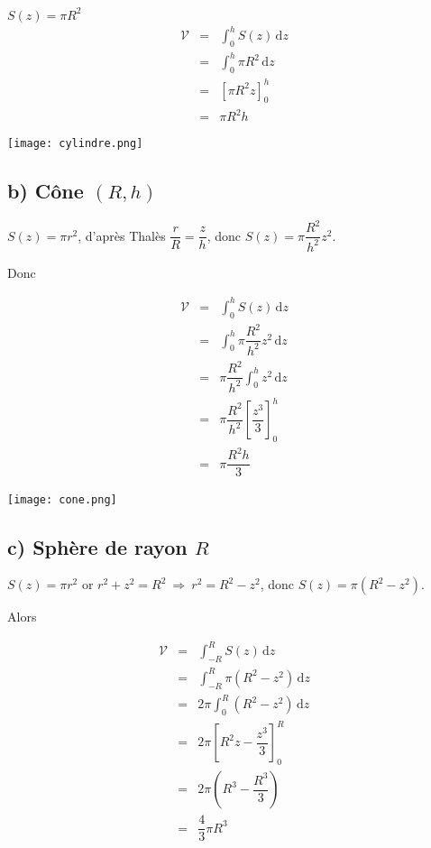 \documentclass[12pt]{article}
\begin{document}
$S(z)=\pi R^{2}$
\begin{eqnarray*}
\mathcal{V} &=& \int_{0}^{h} S(z) \, \mathrm{d}z \\
            &=& \int_{0}^{h} \pi R^{2} \, \mathrm{d}z \\
            &=& \left[\pi R^{2}z \right]_{0}^{h} \\
            &=& \pi R^{2}h
\end{eqnarray*}

\begin{center}
   \texttt{[image: cylindre.png]}
\end{center}

\subsection*{b) Cône $(R, h)$}

$S(z)=\pi r^{2}$, d'après Thalès $\dfrac{r}{R}=\dfrac{z}{h}$, donc $S(z)=\pi\dfrac{R^{2}}{h^{2}}z^{2}.$

Donc 

\begin{eqnarray*}
\mathcal{V} &=& \int_{0}^{h} S(z) \, \mathrm{d}z \\
            &=& \int_{0}^{h} \pi \dfrac{R^{2}}{h^{2}} z^{2} \, \mathrm{d}z \\
            &=& \pi \dfrac{R^{2}}{h^{2}} \int_{0}^{h} z^{2} \, \mathrm{d}z \\
            &=& \pi \dfrac{R^{2}}{h^{2}} \left[\dfrac{z^{3}}{3}\right]_{0}^{h} \\
            &=& \pi \dfrac{R^{2} h}{3}
\end{eqnarray*}

\begin{center}
    \texttt{[image: cone.png]}
\end{center}

\subsection*{c) Sphère de rayon $R$}

$S(z)=\pi r^{2}$ or $r^{2}+z^{2}=R^{2}\ \Rightarrow\ r^{2}=R^{2}-z^{2}$, donc $S(z)=\pi(R^{2}-z^{2}).$

Alors

\begin{eqnarray*}
\mathcal{V} &=& \int_{-R}^{R} S(z) \, \mathrm{d}z \\
            &=& \int_{-R}^{R} \pi (R^{2}-z^{2}) \, \mathrm{d}z \\
            &=& 2\pi \int_{0}^{R} (R^{2}-z^{2}) \, \mathrm{d}z \\
            &=& 2\pi \left[R^{2}z - \dfrac{z^{3}}{3}\right]_{0}^{R} \\
            &=& 2\pi \left(R^{3} - \dfrac{R^{3}}{3}\right) \\
            &=& \dfrac{4}{3}\pi R^{3}
\end{eqnarray*}
\end{document}
